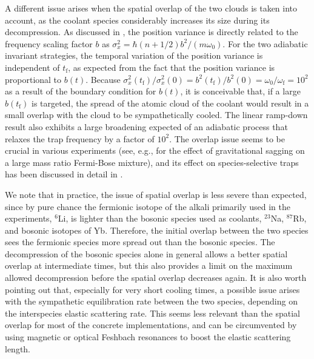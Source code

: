 \documentclass[pra,letterpaper,twocolumn,showpacs,superscriptaddress]{revtex4}
\begin{document}
A different issue arises when the spatial overlap of the two clouds is taken into account, 
as the coolant species considerably increases its size during its decompression. 
As discussed in \cite{Chen2010}, the position variance is directly related to the 
frequency scaling factor $b$ as $\sigma_{x}^2 = \hbar (n+1/2) b^2/(m \omega_0)$.
For the two adiabatic invariant strategies,  the temporal variation of the position variance is 
independent of $t_{\mathrm f}$, as expected from the fact that  the position variance is proportional 
to $b(t)$. Because $\sigma^{2}_x(t_{\mathrm f})/\sigma^{2}_x(0) = b^{2}(t_{\mathrm f})/b^{2}(0) = 
\omega_0/\omega_{\mathrm f} = 10^2$ as a result of the boundary condition for $b(t)$, it is 
conceivable that, if a large $b(t_{\mathrm f})$ is targeted, the spread of the atomic cloud 
of the coolant would result in a small overlap with the cloud to be sympathetically cooled.  
The linear ramp-down result also exhibits a large broadening expected of an adiabatic process 
that relaxes the trap frequency by a factor of $10^2$. The overlap issue seems to be crucial 
in various experiments (see, e.g., \cite{Hansen2011} for the effect of gravitational sagging 
on a large mass ratio Fermi-Bose mixture), and its effect on species-selective traps has been 
discussed in detail in \cite{Brown2008}. 

We note that in practice, the issue of spatial overlap is less severe than expected, since by pure chance the 
fermionic isotope of the alkali primarily used in the experiments, ${}^{6}$Li, is lighter than the bosonic species used as 
coolants, ${}^{23}$Na, ${}^{87}$Rb, and bosonic isotopes of Yb. Therefore, the initial overlap 
between the two species sees the fermionic species more spread out than the bosonic species. 
The decompression of the bosonic species alone in general allows a better spatial overlap 
at intermediate times, but this also provides a limit on the maximum allowed decompression 
before the spatial overlap decreases again. It is also worth pointing out that, especially 
for very short cooling times, a possible issue arises with the sympathetic equilibration rate 
between the two species, depending on the interspecies elastic scattering rate. This seems 
less relevant than the spatial overlap for most of the concrete implementations, and can 
be circumvented by using magnetic or optical Feshbach resonances to boost the elastic 
scattering length.
\end{document}
